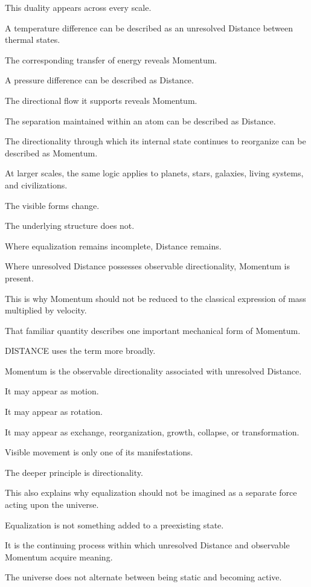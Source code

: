 This duality appears across every scale.

A temperature difference can be described as an unresolved Distance between thermal states.

The corresponding transfer of energy reveals Momentum.

A pressure difference can be described as Distance.

The directional flow it supports reveals Momentum.

The separation maintained within an atom can be described as Distance.

The directionality through which its internal state continues to reorganize can be described as Momentum.

At larger scales, the same logic applies to planets, stars, galaxies, living systems, and civilizations.

The visible forms change.

The underlying structure does not.

Where equalization remains incomplete, Distance remains.

Where unresolved Distance possesses observable directionality, Momentum is present.

This is why Momentum should not be reduced to the classical expression of mass multiplied by velocity.

That familiar quantity describes one important mechanical form of Momentum.

DISTANCE uses the term more broadly.

Momentum is the observable directionality associated with unresolved Distance.

It may appear as motion.

It may appear as rotation.

It may appear as exchange, reorganization, growth, collapse, or transformation.

Visible movement is only one of its manifestations.

The deeper principle is directionality.

This also explains why equalization should not be imagined as a separate force acting upon the universe.

Equalization is not something added to a preexisting state.

It is the continuing process within which unresolved Distance and observable Momentum acquire meaning.

The universe does not alternate between being static and becoming active.

